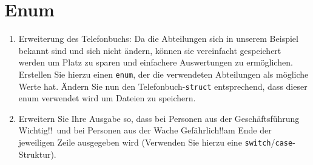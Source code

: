 \documentclass[paper=a4, fontsize=11pt, twoside]{scrartcl}
\begin{document}
\section*{Enum}
\begin{enumerate}[resume]
   \item Erweiterung des Telefonbuchs: Da die Abteilungen sich in unserem Beispiel bekannt sind und sich nicht ändern, können sie vereinfacht gespeichert werden um Platz zu sparen und einfachere Auswertungen zu ermöglichen. Erstellen Sie hierzu einen \texttt{enum}, der die verwendeten Abteilungen als mögliche Werte hat. Ändern Sie nun den Telefonbuch-\texttt{struct} entsprechend, dass dieser enum verwendet wird um Dateien zu speichern.
   \item Erweitern Sie Ihre Ausgabe so, dass bei Personen aus der Geschäftsführung \glqq Wichtig!!\grqq\, und bei Personen aus der Wache \glqq Gefährlich!!\grqq am Ende der jeweiligen Zeile ausgegeben wird (Verwenden Sie hierzu eine \texttt{switch}/\texttt{case}-Struktur).
\end{enumerate}
\end{document}

